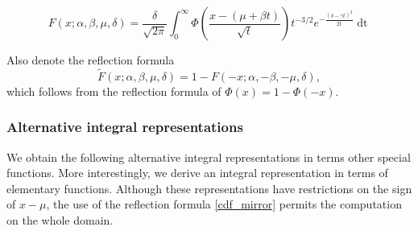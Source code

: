 \documentclass[10pt,a4paper,oneside]{article}
\numberwithin{equation}{section}
\begin{document}
\begin{equation}\label{integral_phi}
F(x; \alpha, \beta, \mu, \delta) = \frac{\delta}{\sqrt{2\pi}}\int_{0}^{\infty} \Phi\left(\frac{x - (\mu +\beta t)}{\sqrt{t}}\right) t^{-3/2} e^{-\frac{(\delta - \gamma t)^2}{2t}} \mathop{dt}
\end{equation}

Also denote the reflection formula
\begin{equation}\label{cdf_mirror}
\tilde{F}(x; \alpha, \beta, \mu, \delta) = 1- F(-x; \alpha, -\beta, -\mu, \delta),
\end{equation}
which follows from the reflection formula of $\Phi(x) = 1 - \Phi(-x)$.

\subsubsection{Alternative integral representations}
We obtain the following alternative integral representations in terms other special functions. More interestingly, we derive an integral representation in terms of elementary functions. Although these representations have restrictions on the sign of $x-\mu$, the use of the reflection formula \eqref{cdf_mirror} permits the computation on the whole domain.
\end{document}
